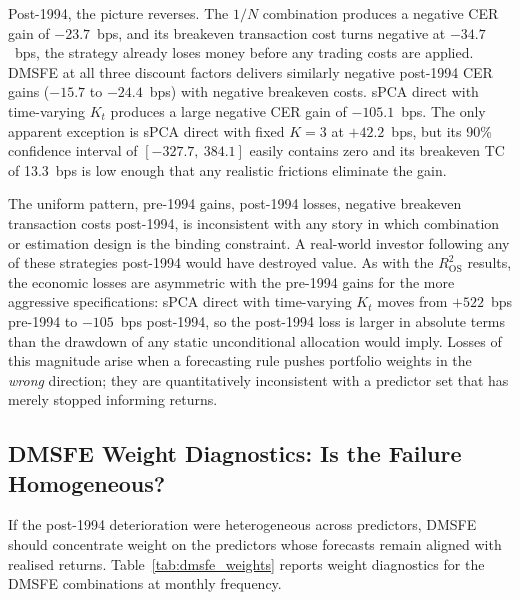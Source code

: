 \documentclass[a4paper,11pt]{article}
\begin{document}
Post-1994, the picture reverses. The $1/N$ combination produces a
negative CER gain of $-23.7$~bps, and its breakeven transaction cost
turns negative at $-34.7$~bps, the strategy already loses money
before any trading costs are applied. DMSFE at all three discount
factors delivers similarly negative post-1994 CER gains ($-15.7$ to
$-24.4$~bps) with negative breakeven costs. sPCA direct with
time-varying $K_t$ produces a large negative CER gain of $-105.1$~bps.
The only apparent exception is sPCA direct with fixed $K=3$ at
$+42.2$~bps, but its 90\% confidence interval of $[-327.7,\ 384.1]$
easily contains zero and its breakeven TC of 13.3~bps is low enough that
any realistic frictions eliminate the gain.

The uniform pattern, pre-1994 gains, post-1994 losses, negative
breakeven transaction costs post-1994, is inconsistent with any
story in which combination or estimation design is the binding
constraint. A real-world investor following any of these strategies
post-1994 would have destroyed value. As with the $R^2_{\mathrm{OS}}$
results, the economic losses are asymmetric with the pre-1994 gains
for the more aggressive specifications: sPCA direct with time-varying
$K_t$ moves from $+522$~bps pre-1994 to $-105$~bps post-1994, so the
post-1994 loss is larger in absolute terms than the drawdown of any
static unconditional allocation would imply. Losses of this magnitude
arise when a forecasting rule pushes portfolio weights in the
\emph{wrong} direction; they are quantitatively inconsistent with a
predictor set that has merely stopped informing returns.

\subsection{DMSFE Weight Diagnostics: Is the Failure Homogeneous?}\label{subsec:dmsfe-weights}

If the post-1994 deterioration were heterogeneous across predictors,
DMSFE should concentrate weight on the predictors whose forecasts remain
aligned with realised returns. Table~\ref{tab:dmsfe_weights} reports
weight diagnostics for the DMSFE combinations at monthly frequency.
\end{document}
